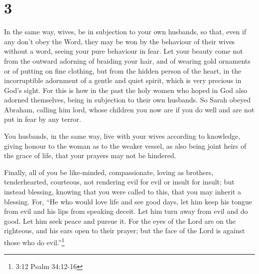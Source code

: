 \hypertarget{section-2}{%
\section{3}\label{section-2}}

 In the same way, wives, be in subjection to your own
husbands, so that, even if any don't obey the Word, they may be won by
the behaviour of their wives without a word,  seeing your
pure behaviour in fear.  Let your beauty come not from the
outward adorning of braiding your hair, and of wearing gold ornaments or
of putting on fine clothing,  but from the hidden person of
the heart, in the incorruptible adornment of a gentle and quiet spirit,
which is very precious in God's sight.  For this is how in
the past the holy women who hoped in God also adorned themselves, being
in subjection to their own husbands.  So Sarah obeyed
Abraham, calling him lord, whose children you now are if you do well and
are not put in fear by any terror.

 You husbands, in the same way, live with your wives
according to knowledge, giving honour to the woman as to the weaker
vessel, as also being joint heirs of the grace of life, that your
prayers may not be hindered.

 Finally, all of you be like-minded, compassionate, loving
as brothers, tenderhearted, courteous,  not rendering evil
for evil or insult for insult; but instead blessing, knowing that you
were called to this, that you may inherit a blessing.  For,
``He who would love life and see good days, let him keep his tongue from
evil and his lips from speaking deceit.  Let him turn away
from evil and do good. Let him seek peace and pursue it. 
For the eyes of the Lord are on the righteous, and his ears open to
their prayer; but the face of the Lord is against those who do
evil.''\footnote{3:12 Psalm 34:12-16}

